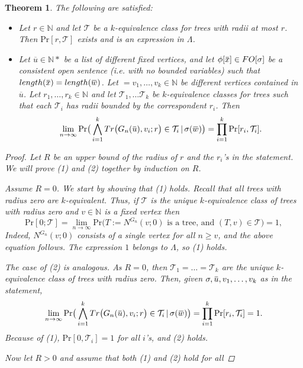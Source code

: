 \documentclass[12pt,notitlepage,a4paper]{article}
\newtheorem{theorem}{Theorem}[section]
\theoremstyle{definition}
\newcommand{\N}{\mathbb{N}}
\newcommand{\Ln}{\lim\limits_{n\to \infty}}
\newcommand{\overbar}[1]{\mkern 1.5mu\overline{\mkern-1.5mu#1\mkern-1.5mu}\mkern 1.5mu}
\begin{document}
\begin{theorem} 
	The following are satisfied:
	\begin{itemize}
		\item[(1)] Let $r\in \N$ and let $\mathcal{T}$ be a
		$k$-equivalence class for trees with radii at most $r$.
		Then $\mathrm{Pr}[r,\mathcal{T}]$ exists and is an expression
		in $\Lambda$.
		\item[(2)] Let $\overline{u}\in \N*$ be a list of different fixed 
		vertices, and let $\phi[\overbar{x}]\in FO[\sigma]$ be a consistent
		open sentence (i.e. with no bounded variables) such that 
		$length(\overbar{x})=length(\overbar{w})$.
		Let $=v_1,\dots,v_k \in \N$ be different vertices
		contained in $\overline{u}$.
		Let $r_1,\dots,r_k \in \N$ and let $\mathcal{T}_1,\dots \mathcal{T}_k$
		be $k$-equivalence classes for trees such that
		each $\mathcal{T}_i$ has radii bounded by the correspondent
		$r_i$. Then
		\[
		\Ln \mathrm{Pr}\big( \bigwedge_{i=1}^k 
		Tr\big(G_n(\overbar{u}),v_i;r\big)\in \mathcal{T}_i \, | \, \sigma(\overbar{w})
		\big)= \prod_{i=1}^k \mathrm{Pr}[r_i,\mathcal{T}_i]. \]	 	
	\end{itemize}
	\begin{proof}
		Let $R$ be an upper bound of the radius of $r$ and the 
		$r_i$'s	in the statement. 
		We will prove (1) and (2) together by induction on $R$. \par
		Assume $R=0$. We start by showing that (1) holds. Recall that
		all trees with radius zero are $k$-equivalent. Thus, if
		$\mathcal{T}$ is the unique $k$-equivalence class of trees
		with radius zero
		and $v\in \N$ is a fixed vertex then
		 \[
		 \mathrm{Pr}[0;\mathcal{T}] = \Ln \mathrm{Pr}\big( 
		 T:=N^{G_n}(v;0) \text{ is a tree, and } (T,v)\in \mathcal{T} \big)
		 =1, 
		 \]
		Indeed, $N^{G_n}(v;0)$ consists of a single vertex for all $n\geq v$,
		and the above equation follows. The expression $1$ belongs to 
		$\Lambda$, so (1) holds. \par
		The case of (2) is analogous. As $R=0$, then $\mathcal{T}_1=\dots=
		\mathcal{T}_k$ are the unique $k$-equivalence class of trees with
		radius zero. Then, given $\sigma, \overbar{u}, v_1,\dots, v_k$ as
		in the statement,
		\[\Ln \mathrm{Pr}\big( \bigwedge_{i=1}^k 
		Tr\big(G_n(\overbar{u}),v_i;r\big)\in \mathcal{T}_i \, | \, \sigma(\overbar{w})
		\big)= \prod_{i=1}^k \mathrm{Pr}[r_i,\mathcal{T}_i]=1. \]	 	
		Because of (1), $\mathrm{Pr}[0,\mathcal{T}_i]=1$ for all $i$'s, 
		and (2) holds. \par
		Now let $R>0$ and assume that both (1) and (2) hold for all 

\end{proof}
\end{theorem}
\end{document}
